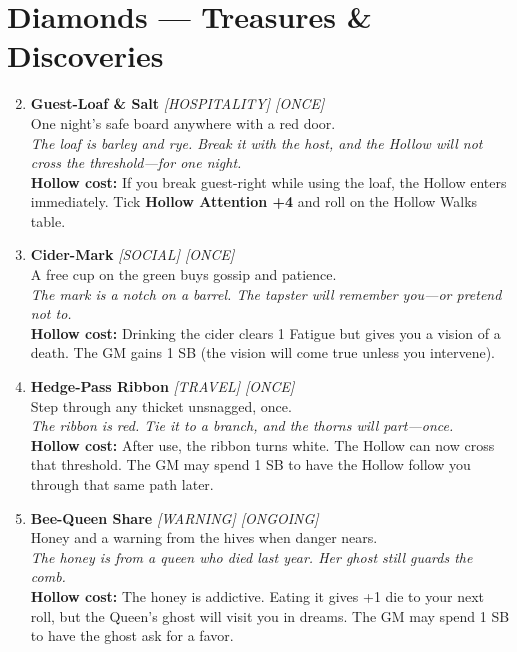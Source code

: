 \section*{Diamonds --- Treasures \& Discoveries}
\label{sec:aelaerem-rewards}
\begin{enumerate}
\setcounter{enumi}{1}
\item \textbf{Guest-Loaf \& Salt} \hfill \textit{[HOSPITALITY] [ONCE]} \\
  One night's safe board anywhere with a red door. \\
  \textit{The loaf is barley and rye. Break it with the host, and the Hollow will not cross the threshold---for one night.} \\
  \textbf{Hollow cost:} If you break guest-right while using the loaf, the Hollow enters immediately. Tick \textbf{Hollow Attention +4} and roll on the Hollow Walks table.

\item \textbf{Cider-Mark} \hfill \textit{[SOCIAL] [ONCE]} \\
  A free cup on the green buys gossip and patience. \\
  \textit{The mark is a notch on a barrel. The tapster will remember you---or pretend not to.} \\
  \textbf{Hollow cost:} Drinking the cider clears 1 Fatigue but gives you a vision of a death. The GM gains 1 SB (the vision will come true unless you intervene).

\item \textbf{Hedge-Pass Ribbon} \hfill \textit{[TRAVEL] [ONCE]} \\
  Step through any thicket unsnagged, once. \\
  \textit{The ribbon is red. Tie it to a branch, and the thorns will part---once.} \\
  \textbf{Hollow cost:} After use, the ribbon turns white. The Hollow can now cross that threshold. The GM may spend 1 SB to have the Hollow follow you through that same path later.

\item \textbf{Bee-Queen Share} \hfill \textit{[WARNING] [ONGOING]} \\
  Honey and a warning from the hives when danger nears. \\
  \textit{The honey is from a queen who died last year. Her ghost still guards the comb.} \\
  \textbf{Hollow cost:} The honey is addictive. Eating it gives +1 die to your next roll, but the Queen's ghost will visit you in dreams. The GM may spend 1 SB to have the ghost ask for a favor.


\end{enumerate}
